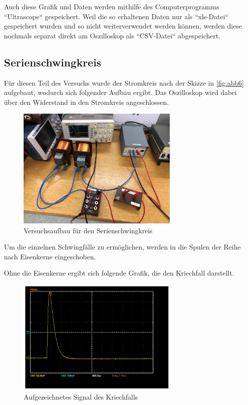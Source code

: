 \documentclass[11pt,ngerman]{scrartcl}
\begin{document}
Auch diese Grafik und Daten werden mithilfe des Computerprogramms ``Ultrascope`` gespeichert. Weil die so erhaltenen Daten nur als
``xls-Datei``
gespeichert wurden und so nicht weiterverwendet werden können, werden diese nochmals separat direkt am Oszilloskop als ``CSV-Datei`` abgespeichert.


\subsection{Serienschwingkreis}

Für diesen Teil des Versuchs wurde der Stromkreis nach der Skizze in \autoref{fig:abb6} aufgebaut, wodurch sich folgender Aufbau ergibt. Das Oszilloskop wird dabei über den Widerstand in den Stromkreis angeschlossen.

\begin{figure}[H]
	\begin{center}
		\includegraphics[width=0.7\textwidth]{aufbau_spule}
	\end{center}
	\caption{Versuchsaufbau für den Serienschwingkreis}
	\label{fig:aufbau_spule}
\end{figure}

Um die einzelnen Schwingfälle zu ermöglichen, werden in die Spulen der Reihe nach Eisenkerne eingeschoben.

Ohne die Eisenkerne ergibt sich folgende Grafik, die den Kriechfall darstellt.

\begin{figure}[H]
	\begin{center}
		\includegraphics[width=0.7\textwidth]{Bild_versuch3_a}
	\end{center}
	\caption{Aufgezeichnetes Signal des Kriechfalls}
	\label{fig:kriechfall}
\end{figure}
\end{document}
